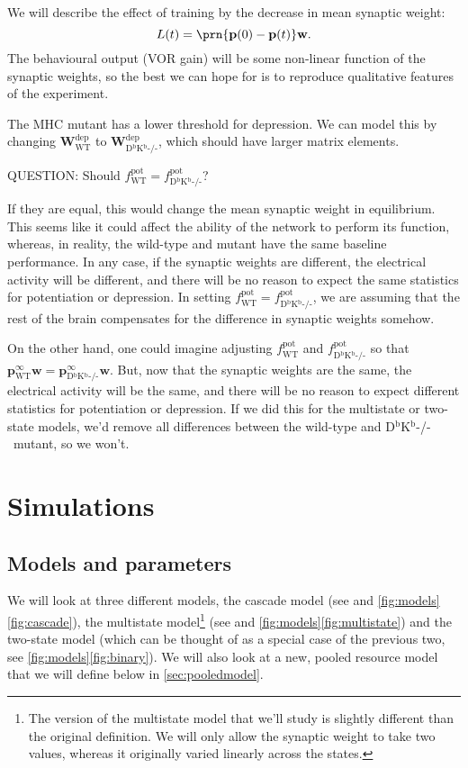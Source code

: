 \documentclass[12pt]{article}
\newcommand{\pr}{\mathbf{p}}
\newcommand{\eq}{\pr^\infty}
\newcommand{\w}{\mathbf{w}}
\newcommand{\W}{\mathbf{W}}
\newcommand{\pot}{^{\text{pot}}}
\newcommand{\dep}{^{\text{dep}}}
\newcommand{\wt}{_{\text{WT}}}
\newcommand{\ko}{_{\text{D$^\mathrm{b}$K$^\mathrm{b}$-/-}}}
\newcommand{\KO}{D$^\mathrm{b}$K$^\mathrm{b}$-/-}
\begin{document}
We will describe the effect of training by the decrease in mean synaptic weight:
%
\begin{equation}\label{eq:learning}
  L(t) = \prn{\pr(0)-\pr(t)}\w.
\end{equation}
%
The behavioural output (VOR gain) will be some non-linear function of the synaptic weights, so the best we can hope for is to reproduce qualitative features of the experiment.

The MHC mutant has a lower threshold for depression.
We can model this by changing $\W\dep\wt$ to $\W\dep\ko$, which should have larger matrix elements.

QUESTION: Should $f\pot\wt=f\pot\ko$?

If they are equal, this would change the mean synaptic weight in equilibrium.
This seems like it could affect the ability of the network to perform its function, whereas, in reality, the wild-type and mutant have the same baseline performance.
In any case, if the synaptic weights are different, the electrical activity will be different, and there will be no reason to expect the same statistics for potentiation or depression.
In setting $f\pot\wt=f\pot\ko$, we are assuming that the rest of the brain compensates for the difference in synaptic weights somehow.

On the other hand, one could imagine adjusting $f\pot\wt$ and $f\pot\ko$ so that $\eq\wt\w = \eq\ko\w$.
But, now that the synaptic weights are the same, the electrical activity will be the same, and there will be no reason to expect different statistics for potentiation or depression.
If we did this for the multistate or two-state models, we'd remove all differences between the wild-type and \KO\ mutant, so we won't.


\section{Simulations}\label{sec:sims}

\subsection{Models and parameters}

We will look at three different models, the cascade model (see \cite{Fusi2005cascade} and \autoref{fig:models}\ref{fig:cascade}), the multistate model\footnote{The version of the multistate model that we'll study is slightly different than the original definition. We will only allow the synaptic weight to take two values, whereas it originally varied linearly across the states. } (see \cite{amit1994learning,Fusi2007multistate} and \autoref{fig:models}\ref{fig:multistate}) and the two-state model (which can be thought of as a special case of the previous two, see \autoref{fig:models}\ref{fig:binary}).
We will also look at a new, pooled resource model that we will define below in \autoref{sec:pooledmodel}.
\end{document}
